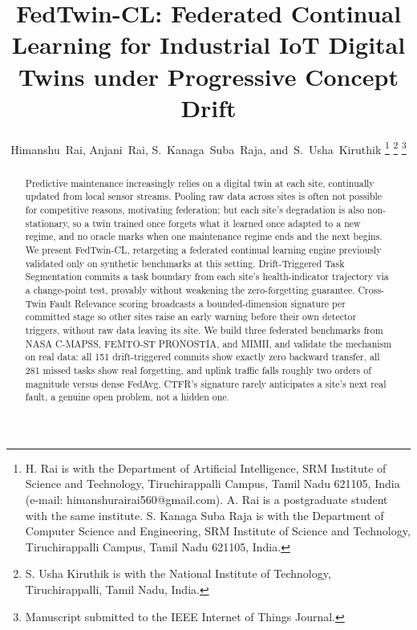 \documentclass[journal]{IEEEtran}
\begin{document}
\title{FedTwin-CL: Federated Continual Learning for Industrial IoT Digital Twins under Progressive Concept Drift}

\author{Himanshu~Rai,
        Anjani~Rai,
        S.~Kanaga~Suba~Raja,
        and~S.~Usha~Kiruthik%
\thanks{H. Rai is with the Department of Artificial Intelligence, SRM Institute of Science and Technology, Tiruchirappalli Campus, Tamil Nadu 621105, India (e-mail: himanshurairai560@gmail.com). A. Rai is a postgraduate student with the same institute. S. Kanaga Suba Raja is with the Department of Computer Science and Engineering, SRM Institute of Science and Technology, Tiruchirappalli Campus, Tamil Nadu 621105, India.}%
\thanks{S. Usha Kiruthik is with the National Institute of Technology, Tiruchirappalli, Tamil Nadu, India.}%
\thanks{Manuscript submitted to the IEEE Internet of Things Journal.}}


\maketitle

\begin{abstract}
Predictive maintenance increasingly relies on a digital twin at each site, continually updated from local sensor streams. Pooling raw data across sites is often not possible for competitive reasons, motivating federation; but each site's degradation is also non-stationary, so a twin trained once forgets what it learned once adapted to a new regime, and no oracle marks when one maintenance regime ends and the next begins. We present FedTwin-CL, retargeting a federated continual learning engine previously validated only on synthetic benchmarks at this setting. Drift-Triggered Task Segmentation commits a task boundary from each site's health-indicator trajectory via a change-point test, provably without weakening the zero-forgetting guarantee. Cross-Twin Fault Relevance scoring broadcasts a bounded-dimension signature per committed stage so other sites raise an early warning before their own detector triggers, without raw data leaving its site. We build three federated benchmarks from NASA C-MAPSS, FEMTO-ST PRONOSTIA, and MIMII, and validate the mechanism on real data: all 151 drift-triggered commits show exactly zero backward transfer, all 281 missed tasks show real forgetting, and uplink traffic falls roughly two orders of magnitude versus dense FedAvg. CTFR's signature rarely anticipates a site's next real fault, a genuine open problem, not a hidden one.
\end{abstract}
\end{document}
